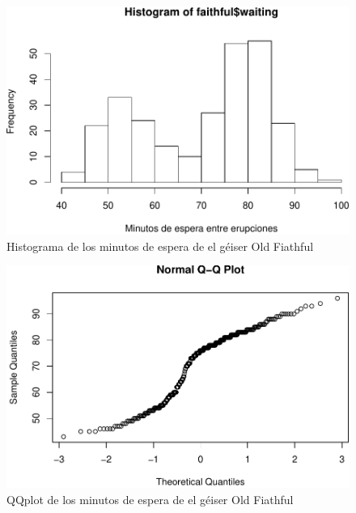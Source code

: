 \documentclass[]{article}
\newenvironment{Shaded}{\begin{snugshade}}{\end{snugshade}}
\newcommand{\KeywordTok}[1]{\textcolor[rgb]{0.13,0.29,0.53}{\textbf{#1}}}
\newcommand{\DataTypeTok}[1]{\textcolor[rgb]{0.13,0.29,0.53}{#1}}
\newcommand{\StringTok}[1]{\textcolor[rgb]{0.31,0.60,0.02}{#1}}
\newcommand{\OperatorTok}[1]{\textcolor[rgb]{0.81,0.36,0.00}{\textbf{#1}}}
\newcommand{\NormalTok}[1]{#1}
\begin{document}
\begin{Shaded}
\end{Shaded}

\begin{figure}
\centering
\includegraphics{Guia5_files/figure-latex/unnamed-chunk-4-1.pdf}
\caption{Histograma de los minutos de espera de el géiser Old Fiathful}
\end{figure}

\begin{Shaded}
\end{Shaded}

\begin{figure}
\centering
\includegraphics{Guia5_files/figure-latex/unnamed-chunk-5-1.pdf}
\caption{QQplot de los minutos de espera de el géiser Old Fiathful}
\end{figure}
\end{document}
